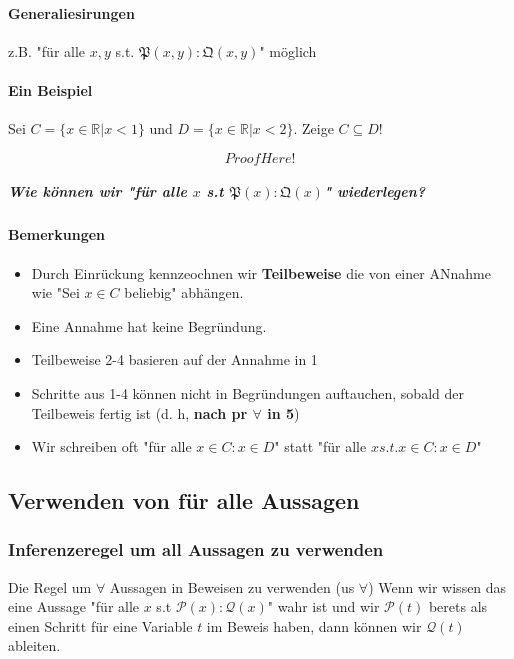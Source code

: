             \paragraph{Generaliesirungen} z.B. "für alle $x, y$ s.t. $\mathfrak{P}(x,y):\mathfrak{Q}(x,y)$" möglich

        \paragraph{Ein Beispiel} 
            Sei $C = \{x \in \mathbb{R} \vert x < 1\}$ und $D = \{x \in \mathbb{R}\vert x < 2\}$. Zeige $C \subseteq D$! 

            \[Proof Here!\]


            \subparagraph*
                {
                    Wie können wir "für alle $x$ s.t $\mathfrak{P}(x) : \mathfrak{Q}(x)$" wiederlegen?
                }

        \paragraph{Bemerkungen}
            \begin{itemize}
                \item Durch Einrückung kennzeochnen wir \textbf{Teilbeweise} die von einer ANnahme wie "Sei $x \in C$ beliebig" abhängen.
                \item Eine Annahme hat keine Begründung.
                \item Teilbeweise 2-4 basieren auf der Annahme in 1
                \item Schritte aus 1-4 können nicht in Begründungen auftauchen, sobald der Teilbeweis fertig ist (d. h, \textbf{nach pr $\forall$ in 5})
                \item Wir schreiben oft "für alle $x \in C : x \in D$" statt "für alle $x s.t. x \in C : x \in D$" 
            \end{itemize}

    \subsection{Verwenden von für alle Aussagen}

        \subsubsection{Inferenzeregel um all Aussagen zu verwenden}
            {
                Die Regel um $\forall$ Aussagen in Beweisen zu verwenden (us $\forall$)
            }
            {
                Wenn wir wissen das eine Aussage "für alle $x$ s.t $\mathcal{P}(x) : \mathcal{Q}(x)$" wahr ist und wir $\mathcal{P}(t)$ berets als einen Schritt für eine Variable $t$ im Beweis haben, dann können wir $\mathcal{Q}(t)$ ableiten.
            }
                
